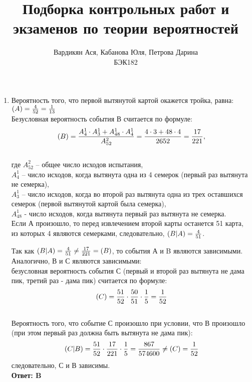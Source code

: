 \documentclass[112pt, cmcyralt]{article}
\title{Подборка контрольных работ и экзаменов по теории вероятностей}
\author{Вардикян Ася, Кабанова Юля, Петрова Дарина \\ БЭК182}
\let\P\relax
\DeclareMathOperator{\P}{\mathbb{P}}
\begin{document}
\maketitle
\newpage
\begin{enumerate}

\section{Промежуточный экзамен 2016-2017 гг}

\item
Вероятность того, что первой вытянутой картой окажется тройка, равна: $\P(A)=\frac{4}{52}=\frac{1}{13}$\\
Безусловная вероятность события В считается по формуле:
$$\P(B)=\frac{A_4^1\cdot A_3^1+A_{48}^1\cdot A_4^1}{A_{52}^2}=\frac{4\cdot3 + 48\cdot4}{2652} = \frac{17}{221},$$\\
где $A_{52}^2$ – общее число исходов испытания,\\
$A_4^1$ – число исходов, когда вытянута одна из 4 семерок (первый раз вытянута не семерка),
\\$A_3^1$ – число исходов, когда во второй раз вытянута одна из трех оставшихся семерок (первой вытянутой картой была семерка), \\$A_{48}^1$ - число исходов, когда вытянута первый раз вытянута не семерка.\\

Если А произошло, то перед извлечением второй карты останется 51 карта, из которых 4 являются семерками, следовательно, $\P(B|A)=\frac{4}{51}$.

Так как $\P(B|A)=\frac{4}{51} \neq \frac{17}{221}=\P(B)$, то события А и B являются зависимыми.\\

Аналогично, В и С являются зависимыми:\\
безусловная вероятность события С (первый и второй раз вытянута не дама пик, третий раз - дама пик) считается по формуле:\\
$$\P(C)=\frac{51}{52}\cdot\frac{50}{51}\cdot\frac{1}{5}=\frac{1}{52}$$\\
Вероятность того, что событие С произошло при условии, что В произошло (при этом первый раз должна быть вытянута не дама пик):\\
$$\P(C|B)=\frac{51}{52}\cdot\frac{17}{221}\cdot\frac{1}{5}=\frac{867}{574600}\neq\P(C)=\frac{1}{52}$$ следовательно, С и В зависимы.\\

\textbf{Ответ: B}


\end{enumerate}
\end{document}
